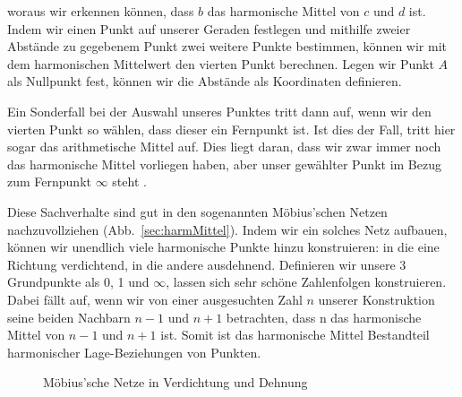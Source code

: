 \documentclass[12pt,a4paper]{article}
\begin{document}
woraus wir erkennen können, dass $b$ das harmonische Mittel von $c$ und $d$ ist. Indem wir einen Punkt auf unserer Geraden festlegen und mithilfe zweier Abstände zu gegebenem Punkt zwei weitere Punkte bestimmen, können wir mit dem harmonischen Mittelwert den vierten Punkt berechnen. Legen wir Punkt $A$ als Nullpunkt fest, können wir die Abstände als Koordinaten definieren.

Ein Sonderfall bei der Auswahl unseres Punktes tritt dann auf, wenn wir den vierten Punkt so wählen, dass dieser ein Fernpunkt ist. Ist dies der Fall, tritt hier sogar das arithmetische Mittel auf. Dies liegt daran, dass wir zwar immer noch das harmonische Mittel vorliegen haben, aber unser gewählter Punkt im Bezug zum Fernpunkt $\infty$ steht \citep[s.][S.~44]{harmonischeLage}.

Diese Sachverhalte sind gut in den sogenannten Möbius'schen Netzen nachzuvollziehen (Abb.~\ref{sec:harmMittel}). Indem wir ein solches Netz aufbauen, können wir unendlich viele harmonische Punkte hinzu konstruieren: in die eine Richtung verdichtend, in die andere ausdehnend. Definieren wir unsere 3 Grundpunkte als 0, 1 und $\infty$, lassen sich sehr schöne Zahlenfolgen konstruieren. Dabei fällt auf, wenn wir von einer ausgesuchten Zahl $n$ unserer Konstruktion seine beiden Nachbarn $n-1$ und $n+1$ betrachten, dass n das harmonische Mittel von $n-1$ und $n+1$ ist. Somit ist das harmonische Mittel Bestandteil harmonischer Lage-Beziehungen von Punkten.



\begin{figure} [htbp]
 \hfill
{}
\caption{Möbius'sche Netze in Verdichtung und Dehnung}
\end{figure} 
\end{document}
